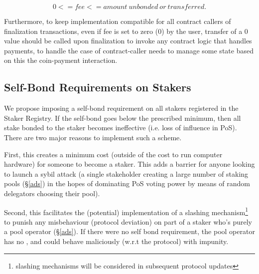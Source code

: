 $$0 <= fee <= amount\ unbonded\ or\ transferred.$$

Furthermore, to keep implementation compatible for all contract callers of finalization transactions, even if fee is set to zero (0) by the user, transfer of a 0 value should be called upon finalization to invoke any contract logic that handles payments, to handle the case of contract-caller needs to manage some state based on this the coin-payment interaction.

\subsection{Self-Bond Requirements on Stakers} \label{self_bond}
We propose imposing a self-bond requirement on all stakers registered in the Staker Registry. If the self-bond goes below the prescribed minimum, then all stake bonded to the staker becomes ineffective (i.e. loss of influence in PoS). There are two major reasons to implement such a scheme.

First, this creates a minimum cost (outside of the cost to run computer hardware) for someone to become a staker. This adds a barrier for anyone looking to launch a sybil attack (a single stakeholder creating a large number of staking pools (\S\ref{ads}) in the hopes of dominating PoS voting power by means of random delegators choosing their pool). 
 
Second, this facilitates the (potential) implementation of a slashing mechanism\footnote{slashing mechanisms will be considered in subsequent protocol updates} to punish any misbehaviour (protocol deviation) on part of a staker who's purely a pool operator (\S\ref{ads}). If there were no self bond requirement, the pool operator has no , and could behave maliciously (w.r.t the protocol) with impunity. 

